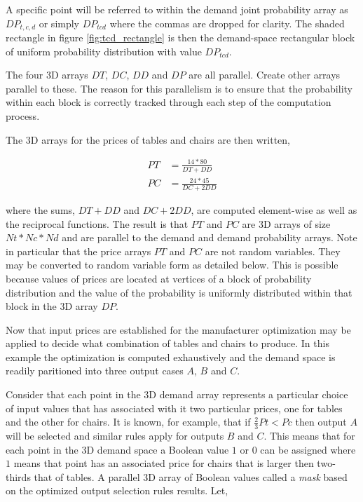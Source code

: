 A specific point will be referred to within the demand joint probability array as $DP_{t,c,d}$ or simply $DP_{tcd}$ where the commas are dropped for clarity. The shaded rectangle in figure \ref{fig:tcd_rectangle} is then the demand-space rectangular block of uniform probability distribution with value $DP_{tcd}$.

The four 3D arrays $DT$, $DC$, $DD$ and $DP$ are all parallel. Create other arrays parallel to these. The reason for this parallelism is to ensure that the probability within each block is correctly tracked through each step of the computation process.

The 3D arrays for the prices of tables and chairs are then written,

\begin{align*}
PT &= \frac{14*80}{DT + DD}\\
PC &= \frac{24*45}{DC + 2 DD}
\end{align*}

where the sums, $DT+DD$ and $DC + 2DD$, are computed element-wise as well as the reciprocal functions. The result is that $PT$ and $PC$ are 3D arrays of size $Nt*Nc*Nd$ and are parallel to the demand and demand probability arrays. Note in particular that the price arrays $PT$ and $PC$ are not random variables. They may be converted to random variable form as detailed below. This is possible because values of prices are located at vertices of a block of probability distribution and the value of the probability is uniformly distributed within that block in the 3D array $DP$.

Now that input prices are established for the manufacturer optimization may be applied to decide what combination of tables and chairs to produce. In this example the optimization is computed exhaustively and the demand space is readily paritioned into three output cases $A$, $B$ and $C$. 

Consider that each point in the 3D demand array represents a particular choice of input values that has associated with it two particular prices, one for tables and the other for chairs. It is known, for example, that if $\frac{2}{3}Pt < Pc$ then output $A$ will be selected and similar rules apply for outputs $B$ and $C$. This means that for each point in the 3D demand space a Boolean value $1$ or $0$ can be assigned where $1$ means that point has an associated price for chairs that is larger then two-thirds that of tables. A parallel 3D array of Boolean values called a \emph{mask} based on the optimized output selection rules results. Let,

